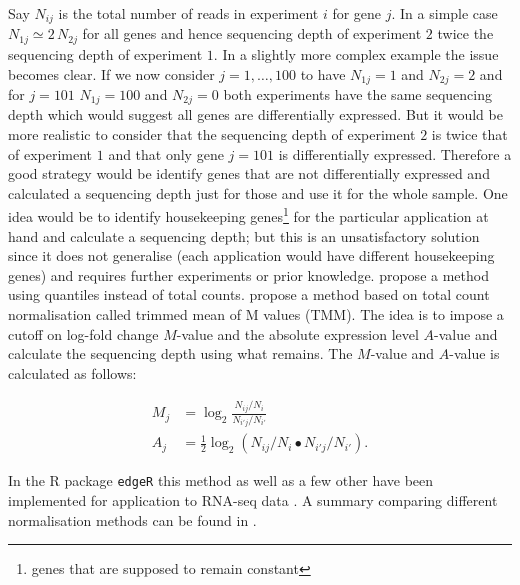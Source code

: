 Say $N_{ij}$ is the total number of reads in experiment $i$ for gene $j$. In a simple case $N_{1j} \simeq 2 \, N_{2j}$ for all genes and hence sequencing depth of experiment $2$ twice the sequencing depth of experiment $1$. In a slightly more complex example the issue becomes clear. If we now consider $j = 1, \ldots,  100$ to have $N_{1j} = 1$ and $N_{2j} = 2$ and for $j = 101$ $N_{1j} = 100$ and $N_{2j} = 0$ both experiments have the same sequencing depth which would suggest all genes are differentially expressed. But it would be more realistic to consider that the sequencing depth of experiment $2$ is twice that of experiment $1$ and that only gene $j = 101$ is differentially expressed. Therefore a good strategy would be identify genes that are not differentially expressed and calculated a sequencing depth just for those and use it for the whole sample. One idea would be to identify housekeeping genes\footnote{genes that are supposed to remain constant} for the particular application at hand and calculate a sequencing depth; but this is an unsatisfactory solution since it does not generalise (each application would have different housekeeping genes) and requires further experiments or prior knowledge. \cite{Bullard:2010go} propose a method using quantiles instead of total counts. \cite{Robinson:2010dd} propose a method based on total count normalisation called trimmed mean of M values (TMM). The idea is to impose a cutoff on log-fold change $M$-value and the absolute expression level $A$-value and calculate the sequencing depth using what remains. The $M$-value  and $A$-value is calculated as follows:

\begin{eqnarray}
  \label{eq:MA-values}
  M_j &= \log_2 \frac{N_{ij} / N_i}{N_{i'j}/ N_{i'}} \\
  A_j &= \frac{1}{2} \log_2 \left(N_{ij}/ N_i \bullet N_{i'j} / N_{i'} \right).
\end{eqnarray}

In the R package \texttt{edgeR} this method as well as a few other have been implemented for application to RNA-seq data \cite{Robinson:2010cw}. 
A summary comparing different normalisation methods can be found in \cite{Oshlack:2010kr}. 


